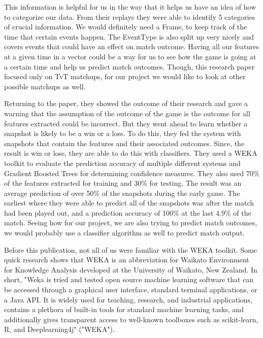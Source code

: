 \documentclass[a4paper,12pt]{report}
\begin{document}
This information is helpful for us in the way that it helps us have an idea of how to categorize our data. From their replays they were able to identify 5 categories of crucial information. We would definitely need a Frame, to keep track of the time that certain events happen. The EventType is also split up very nicely and covers events that could have an effect on match outcome. Having all our features at a given time in a vector could be a way for us to see how the game is going at a certain time and help us predict match outcomes. Though, this research paper focused only on TvT matchups, for our project we would like to look at other possible matchups as well.

Returning to the paper, they showed the outcome of their research and gave a warning that the assumption of the outcome of the game is the outcome for all features extracted could be incorrect. But they went ahead to learn whether a snapshot is likely to be a win or a loss. To do this, they fed the system with snapshots that contain the features and their associated outcomes. Since, the result is win or lose, they are able to do this with classifiers. They used a WEKA toolkit to evaluate the prediction accuracy of multiple different systems and Gradient Boosted Trees for determining confidence measures. They also used 70\% of the features extracted for training and 30\% for testing. The result was an average prediction of over 50\% of the snapshots during the early game. The earliest where they were able to predict all of the snapshots was after the match had been played out, and a prediction accuracy of 100\% at the last 4.9\% of the match.
Seeing how for our project, we are also trying to predict match outcomes, we would probably use a classifier algorithm as well to predict match output.

 Before this publication, not all of us were familiar with the WEKA toolkit. Some quick research shows that WEKA is an abbreviation for Waikato Environment for Knowledge Analysis developed at the University of Waikato, New Zealand. In short, "Weka is tried and tested open source machine learning software that can be accessed through a graphical user interface, standard terminal applications, or a Java API. It is widely used for teaching, research, and industrial applications, contains a plethora of built-in tools for standard machine learning tasks, and additionally gives transparent access to well-known toolboxes such as scikit-learn, R, and Deeplearning4j" ("WEKA"). 
\end{document}
